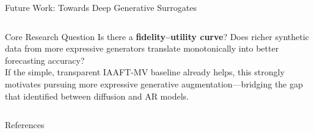 \documentclass[aspectratio=169,10pt]{beamer}
\begin{document}
\begin{frame}{Future Work: Towards Deep Generative Surrogates}
\begin{columns}[T]
      \vspace{0.6em}
      \begin{alertblock}{Core Research Question}
        \small
        Is there a \textbf{fidelity--utility curve}?
        Does richer synthetic data from more expressive generators
        translate monotonically into better forecasting accuracy?\\[0.4em]
        If the simple, transparent IAAFT-MV baseline already helps,
        this strongly motivates pursuing more expressive generative
        augmentation---bridging the gap that
        \citet{prabhudesai2025diffusion} identified between diffusion
        and AR models.
      \end{alertblock}
  \end{columns}
\end{frame}

\begin{frame}[allowframebreaks]{References}
  \footnotesize
  
  
\end{frame}

\end{document}
